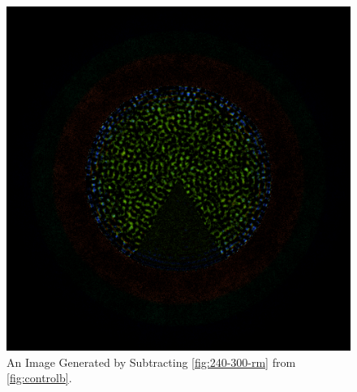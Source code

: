 \begin{figure}[H]
\centering
\includegraphics[width=0.6\linewidth]{figures/240-300/diff-240-300}
\caption{An Image Generated by Subtracting \ref{fig:240-300-rm} from \ref{fig:controlb}.}
\label{fig:240-300-diff}
\end{figure}